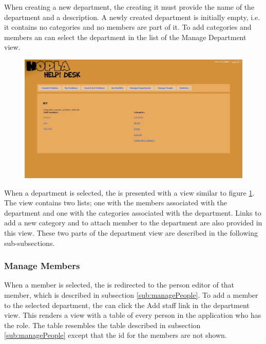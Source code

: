 When creating a new department, the \admin[] creating it must provide the name of the department and a description.
A newly created department is initially empty, i.e. it contains no categories and no \astaff[] members are part of it.
To add categories and \astaff[] members an \admin[] can select the department in the list of the Manage Department view.

\begin{figure}[htb]
	\centering
		\includegraphics[width=1.00\textwidth, clip=true, trim=2.9cm 6cm 10cm 8cm]{input/implementation/program_presentation/department.png}
	\label{fig:department}
\end{figure}

When a department is selected, the \admin[] is presented with a view similar to figure \ref{fig:department}.
The view contains two lists; one with the \astaff[] members associated with the department and one with the categories associated with the department.
Links to add a new category and to attach \astaff[] member to the department are also provided in this view.
These two parts of the department view are described in the following sub-subsections.

\subsubsection{Manage \astaff[c] Members}
When a \astaff[] member is selected, the \admin[] is redirected to the person editor of that \astaff[] member, which is described in subsection \ref{sub:managePeople}.
To add a \astaff[] member to the selected department, the \admin[] can click the Add staff link in the department view.
This renders a view with a table of every person in the application who has the \astaff[] role.
The table resembles the table described in subsection \ref{sub:managePeople} except that the id for the \astaff[] members are not shown.

